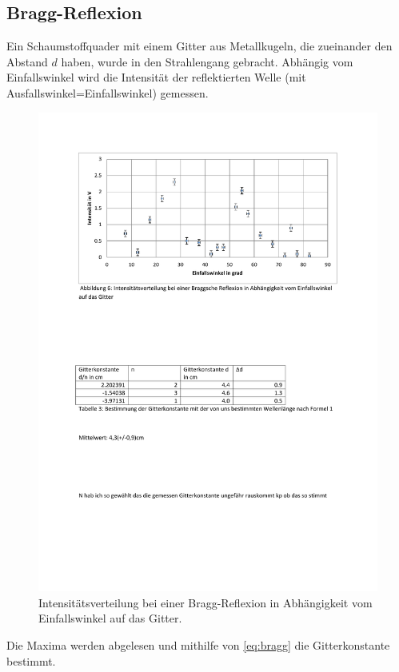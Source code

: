 \subsection{Bragg-Reflexion}
Ein Schaumstoffquader mit einem Gitter aus Metallkugeln, die zueinander den Abstand $d$ haben, wurde in den Strahlengang gebracht. 
Abhängig vom Einfallswinkel wird die Intensität der reflektierten Welle (mit Ausfallswinkel=Einfallswinkel) gemessen.
\begin{figure}[H]
\centering
\includegraphics[width=\linewidth, trim=2.2cm 19cm 2.3cm 2.3cm, clip=true]{res/Nr6.pdf}
\caption{Intensitätsverteilung bei einer Bragg-Reflexion in Abhängigkeit vom Einfallswinkel auf das Gitter.}
\label{fig:bragg}
\end{figure}
Die Maxima werden abgelesen und mithilfe von \cref{eq:bragg} die Gitterkonstante bestimmt.
